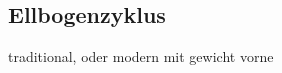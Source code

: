 \begin{WTGradSG}{5}


\subsection{Ellbogenzyklus}

traditional, oder modern mit gewicht vorne


\end{WTGradSG}
\begin{WTGradSG}{6}

\end{WTGradSG}
\begin{WTGradSG}{7}

\end{WTGradSG}
\begin{WTGradSG}{8}

\end{WTGradSG}
\begin{WTGradSG}{9}

\end{WTGradSG}
\begin{WTGradSG}{10}

\end{WTGradSG}
\begin{WTGradSG}{11}

\end{WTGradSG}
\begin{WTGradSG}{12}

\end{WTGradSG}


